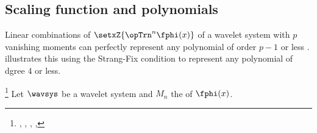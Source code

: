 \subsection{Scaling function and polynomials}
Linear combinations of $\setxZ{\opTrn^n\fphi(x)}$ of a wavelet system with $p$ vanishing moments
can perfectly represent any polynomial of order $p-1$ or less .
 illustrates this using the Strang-Fix condition   
to represent any polynomial of dgree $4$ or less.
\begin{lemma} %
\label{lem:sfixc}
\footnote{
  ,
  ,
  ,
  ,
  }
Let $\wavsys$ be a wavelet system and $M_n$ the   of $\fphi(x)$.
\end{lemma}
